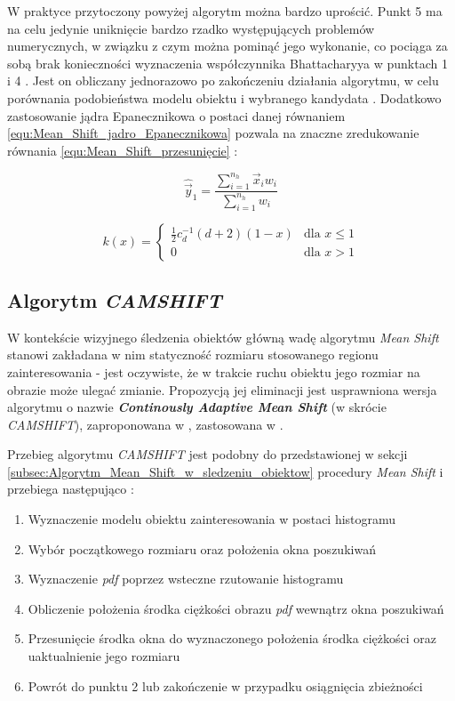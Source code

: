 W praktyce przytoczony powyżej algorytm można bardzo uprościć. Punkt 5 ma na celu jedynie uniknięcie bardzo rzadko występujących problemów numerycznych, w związku z czym można pominąć jego wykonanie, co pociąga za sobą brak konieczności wyznaczenia współczynnika Bhattacharyya w punktach 1 i 4 \cite{Comaniciu2003}. Jest on obliczany jednorazowo po zakończeniu działania algorytmu, w celu porównania podobieństwa modelu obiektu i wybranego kandydata \cite{Comaniciu2003}. Dodatkowo zastosowanie jądra Epanecznikowa o postaci danej równaniem \ref{equ:Mean_Shift_jadro_Epanecznikowa} pozwala na znaczne zredukowanie równania \ref{equ:Mean_Shift_przesunięcie} \cite{Comaniciu2003}:

\begin{equation}
\label{equ:Mean_Shift_przesunięcie_zredukowane}
	\hat{\vec{y}}_1 = \frac{\sum_{i=1}^{n_h}\vec{x}_i w_i}{\sum_{i=1}^{n_h} w_i}
\end{equation}

\begin{equation}
\label{equ:Mean_Shift_jadro_Epanecznikowa}
	k(x) = 
	\begin{cases}
		\frac{1}{2}c_d^{-1}(d+2)(1-x) & \text{dla } x \leq 1 \\
		0 & \text{dla } x > 1
	\end{cases}
\end{equation}

\subsection{Algorytm \textit{CAMSHIFT}}
\label{subsec:Algorytm_CAMSHIFT}

W kontekście wizyjnego śledzenia obiektów główną wadę algorytmu \textit{Mean Shift} stanowi zakładana w nim statyczność rozmiaru stosowanego regionu zainteresowania - jest oczywiste, że w trakcie ruchu obiektu jego rozmiar na obrazie może ulegać zmianie. Propozycją jej eliminacji jest usprawniona wersja algorytmu o nazwie \textbf{\textit{Continously Adaptive Mean Shift}} (w skrócie \textit{CAMSHIFT}), zaproponowana w \cite{Bradski1998}, zastosowana w \cite{Zhang2011}.

Przebieg algorytmu \textit{CAMSHIFT} jest podobny do przedstawionej w sekcji \ref{subsec:Algorytm_Mean_Shift_w_sledzeniu_obiektow} procedury \textit{Mean Shift}  i przebiega następująco \cite{Bradski1998}:

\begin{enumerate}
	\item Wyznaczenie modelu obiektu zainteresowania w postaci histogramu
	\item Wybór początkowego rozmiaru oraz położenia okna poszukiwań
	\item Wyznaczenie \textit{pdf} poprzez wsteczne rzutowanie histogramu 
	\item Obliczenie położenia środka ciężkości obrazu \textit{pdf} wewnątrz okna poszukiwań
	\item Przesunięcie środka okna do wyznaczonego położenia środka ciężkości oraz uaktualnienie jego rozmiaru
	\item Powrót do punktu 2 lub zakończenie w przypadku osiągnięcia zbieżności
\end{enumerate}

